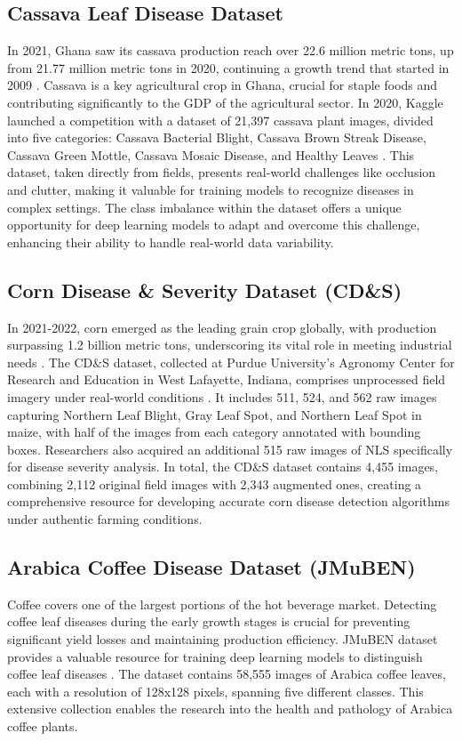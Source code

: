 \documentclass[sn-mathphys]{sn-jnl}
\theoremstyle{thmstyleone}%
\theoremstyle{thmstyletwo}%
\theoremstyle{thmstylethree}%
\begin{document}
\subsection{Cassava Leaf Disease Dataset}
In 2021, Ghana saw its cassava production reach over 22.6 million metric tons, up from 21.77 million metric tons in 2020, continuing a growth trend that started in 2009 \citep{statista2023cassavaproductionghana}. Cassava is a key agricultural crop in Ghana, crucial for staple foods and contributing significantly to the GDP of the agricultural sector. In 2020, Kaggle launched a competition with a dataset of 21,397 cassava plant images, divided into five categories: Cassava Bacterial Blight, Cassava Brown Streak Disease, Cassava Green Mottle, Cassava Mosaic Disease, and Healthy Leaves \citep{Cassava_Competition}. This dataset, taken directly from fields, presents real-world challenges like occlusion and clutter, making it valuable for training models to recognize diseases in complex settings. The class imbalance within the dataset offers a unique opportunity for deep learning models to adapt and overcome this challenge, enhancing their ability to handle real-world data variability.

\subsection{Corn Disease \& Severity Dataset (CD\&S)}
In 2021-2022, corn emerged as the leading grain crop globally, with production surpassing 1.2 billion metric tons, underscoring its vital role in meeting industrial needs \citep{statista2023grainproduction}. The CD\&S dataset, collected at Purdue University's Agronomy Center for Research and Education in West Lafayette, Indiana, comprises unprocessed field imagery under real-world conditions \citep{CDS}. It includes 511, 524, and 562 raw images capturing Northern Leaf Blight, Gray Leaf Spot, and Northern Leaf Spot in maize, with half of the images from each category annotated with bounding boxes. Researchers also acquired an additional 515 raw images of NLS specifically for disease severity analysis. In total, the CD\&S dataset contains 4,455 images, combining 2,112 original field images with 2,343 augmented ones, creating a comprehensive resource for developing accurate corn disease detection algorithms under authentic farming conditions.

\subsection{Arabica Coffee Disease Dataset (JMuBEN)}
Coffee covers one of the largest portions of the hot beverage market. 
Detecting coffee leaf diseases during the early growth stages is crucial for preventing significant yield losses and maintaining production efficiency. JMuBEN dataset provides a valuable resource for training deep learning models to distinguish coffee leaf diseases \citep{jepkoech2021jmuben2}. The dataset contains 58,555 images of Arabica coffee leaves, each with a resolution of 128x128 pixels, spanning five different classes. This extensive collection enables the research into the health and pathology of Arabica coffee plants.
\end{document}
